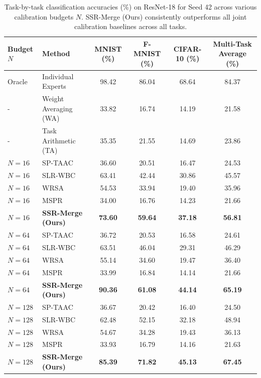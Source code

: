 \documentclass{article}
\theoremstyle{plain}
\theoremstyle{definition}
\theoremstyle{remark}
\begin{document}
\begin{table}[t]
\caption{Task-by-task classification accuracies (\%) on ResNet-18 for Seed 42 across various calibration budgets $N$. SSR-Merge (Ours) consistently outperforms all joint calibration baselines across all tasks.}
\label{tab:detailed_task_results}
\vskip 0.15in
\begin{center}
\begin{small}
\begin{tabular}{llcccc}
\toprule
Budget $N$ & Method & MNIST (\%) & F-MNIST (\%) & CIFAR-10 (\%) & Multi-Task Average (\%) \\
\midrule
Oracle & Individual Experts & 98.42 & 86.04 & 68.64 & 84.37 \\
- & Weight Averaging (WA) & 33.82 & 16.74 & 14.19 & 21.58 \\
- & Task Arithmetic (TA) & 35.35 & 21.55 & 14.69 & 23.86 \\
\midrule
$N=16$ & SP-TAAC & 36.60 & 20.51 & 16.47 & 24.53 \\
$N=16$ & SLR-WBC & 63.41 & 42.44 & 30.86 & 45.57 \\
$N=16$ & WRSA & 54.53 & 33.94 & 19.40 & 35.96 \\
$N=16$ & MSPR & 34.00 & 16.76 & 14.23 & 21.66 \\
$N=16$ & \textbf{SSR-Merge (Ours)} & \textbf{73.60} & \textbf{59.64} & \textbf{37.18} & \textbf{56.81} \\
\midrule
$N=64$ & SP-TAAC & 36.72 & 20.53 & 16.58 & 24.61 \\
$N=64$ & SLR-WBC & 63.51 & 46.04 & 29.31 & 46.29 \\
$N=64$ & WRSA & 55.14 & 34.60 & 19.47 & 36.40 \\
$N=64$ & MSPR & 33.99 & 16.84 & 14.14 & 21.66 \\
$N=64$ & \textbf{SSR-Merge (Ours)} & \textbf{90.36} & \textbf{61.08} & \textbf{44.14} & \textbf{65.19} \\
\midrule
$N=128$ & SP-TAAC & 36.67 & 20.42 & 16.40 & 24.50 \\
$N=128$ & SLR-WBC & 62.48 & 52.15 & 32.18 & 48.94 \\
$N=128$ & WRSA & 54.67 & 34.28 & 19.43 & 36.13 \\
$N=128$ & MSPR & 33.93 & 16.79 & 14.16 & 21.63 \\
$N=128$ & \textbf{SSR-Merge (Ours)} & \textbf{85.39} & \textbf{71.82} & \textbf{45.13} & \textbf{67.45} \\
\bottomrule
\end{tabular}
\end{small}
\end{center}
\end{table}
\end{document}
